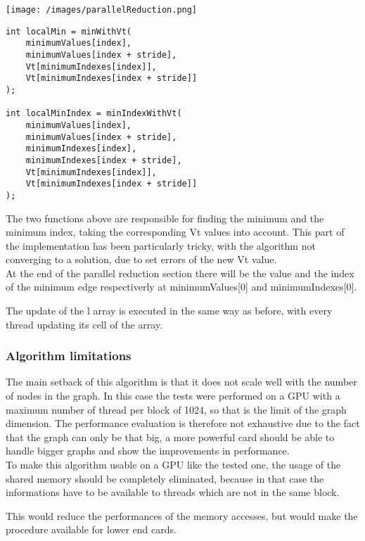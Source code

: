 \documentclass[
	a4paper, %
	12pt, %
]{class}
\begin{document}
\begin{center}
    \texttt{[image: /images/parallelReduction.png]}
\end{center}
\begin{verbatim}
int localMin = minWithVt(
    minimumValues[index],
    minimumValues[index + stride],
    Vt[minimumIndexes[index]],
    Vt[minimumIndexes[index + stride]]
);

int localMinIndex = minIndexWithVt(
    minimumValues[index],
    minimumValues[index + stride],
    minimumIndexes[index],
    minimumIndexes[index + stride],
    Vt[minimumIndexes[index]],
    Vt[minimumIndexes[index + stride]]
);
\end{verbatim}
The two functions above are responsible for finding the minimum and the minimum index, taking the corresponding Vt values into account.
This part of the implementation has been particularly tricky, with the algorithm not converging to a solution, due to set errors of the new Vt value.\\

At the end of the parallel reduction section there will be the value and the index of the minimum edge respectiverly at minimumValues[0] and minimumIndexes[0].

The update of the l array is executed in the same way as before, with every thread updating its cell of the array.\\

\subsubsection{Algorithm limitations}

The main setback of this algorithm is that it does not scale well with the number of nodes in the graph. In this case the tests were performed on a GPU with
a maximum number of thread per block of 1024, so that is the limit of the graph dimension. The performance evaluation is therefore not exhaustive due to the fact that the graph can
only be that big, a more powerful card should be able to handle bigger graphs and show the improvements in performance.\\

To make this algorithm usable on a GPU like the tested one, the usage of the shared memory should be completely eliminated,
because in that case the informations have to be available to threads which are not in the same block.

This would reduce the performances of the memory accesses, but would make the procedure available for lower end cards.\\
\end{document}
